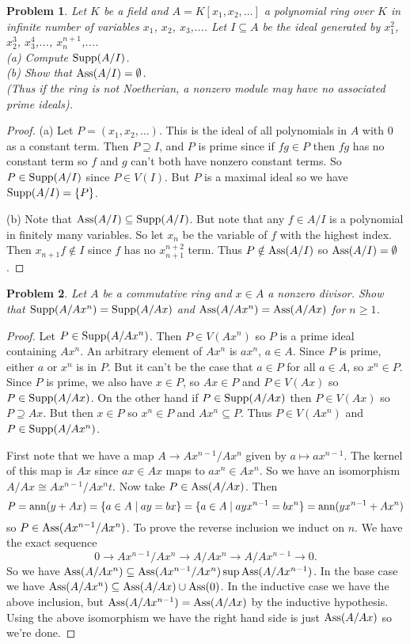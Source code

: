 \documentclass{article}
\newcommand{\ass}{\textup{Ass}}
\newcommand{\supp}{\textup{Supp}}
\newcommand{\ann}{\textup{ann}}
\newtheorem{problem}{Problem}
\begin{document}
\begin{problem}
Let $K$ be a field and $A = K[x_1, x_2, \dots ]$ a polynomial ring over $K$ in infinite number of variables $x_1$, $x_2$, $x_3$,.... Let $I \subseteq A$ be the ideal generated by $x_1^2$, $x_2^3$, $x_3^4$,..., $x_n^{n+1}$,....\\
(a) Compute $\supp(A/I)$.\\
(b) Show that $\ass(A/I) = \emptyset$.\\
(Thus if the ring is \emph{not} Noetherian, a nonzero module may have no associated prime ideals).
\end{problem}
\begin{proof}
(a) Let $P = (x_1, x_2, \dots )$. This is the ideal of all polynomials in $A$ with $0$ as a constant term. Then $P \supseteq I$, and $P$ is prime since if $fg \in P$ then $fg$ has no constant term so $f$ and $g$ can't both have nonzero constant terms. So $P \in \supp(A/I)$ since $P \in V(I)$. But $P$ is a maximal ideal so we have $\supp(A/I) = \{P\}$.

(b) Note that $\ass(A/I) \subseteq \supp(A/I)$. But note that any $f \in A/I$ is a polynomial in finitely many variables. So let $x_n$ be the variable of $f$ with the highest index. Then $x_{n+1}f \notin I$ since $f$ has no $x_{n+1}^{n+2}$ term. Thus $P \notin \ass(A/I)$ so $\ass(A/I) = \emptyset$.
\end{proof}

\begin{problem}
Let $A$ be a commutative ring and $x \in A$ a nonzero divisor. Show that $\supp(A/Ax^n) = \supp(A/Ax)$ and $\ass(A/Ax^n) = \ass(A/Ax)$ for $n \geq 1$.
\end{problem}
\begin{proof}
Let $P \in \supp(A/Ax^n)$. Then $P \in V(Ax^n)$ so $P$ is a prime ideal containing $Ax^n$. An arbitrary element of $Ax^n$ is $ax^n$, $a \in A$. Since $P$ is prime, either $a$ or $x^n$ is in $P$. But it can't be the case that $a \in P$ for all $a \in A$, so $x^n \in P$. Since $P$ is prime, we also have $x \in P$, so $Ax \in P$ and $P \in V(Ax)$ so $P \in \supp(A/Ax)$. On the other hand if $P \in \supp(A/Ax)$ then $P \in V(Ax)$ so $P \supseteq Ax$. But then $x \in P$ so $x^n \in P$ and $Ax^n \subseteq P$. Thus $P \in V(Ax^n)$ and $P \in \supp(A/Ax^n)$.

First note that we have a map $A \to Ax^{n-1}/Ax^n$ given by $a \mapsto ax^{n-1}$. The kernel of this map is $Ax$ since $ax \in Ax$ maps to $ax^n \in Ax^n$. So we have an isomorphism $A/Ax \cong Ax^{n-1}/Ax^nt$. Now take $P \in \ass(A/Ax)$. Then
\[
P = \ann(y + Ax) = \{a \in A \mid ay = bx\} = \{a \in A \mid ayx^{n-1} = bx^n\} = \ann(yx^{n-1} + Ax^n)
\]
so $P \in \ass(Ax^{n-1}/Ax^n)$. To prove the reverse inclusion we induct on $n$. We have the exact sequence
\[
0 \to Ax^{n-1}/Ax^n \to A/Ax^n \to A/Ax^{n-1} \to 0.
\]
So we have $\ass(A/Ax^n) \subseteq \ass(Ax^{n-1}/Ax^n) \sup \ass(A/Ax^{n-1})$. In the base case we have $\ass(A/Ax^n) \subseteq \ass(A/Ax) \cup \ass(0)$. In the inductive case we have the above inclusion, but $\ass(A/Ax^{n-1}) = \ass(A/Ax)$ by the inductive hypothesis. Using the above isomorphism we have the right hand side is just $\ass(A/Ax)$ so we're done.
\end{proof}
\end{document}
